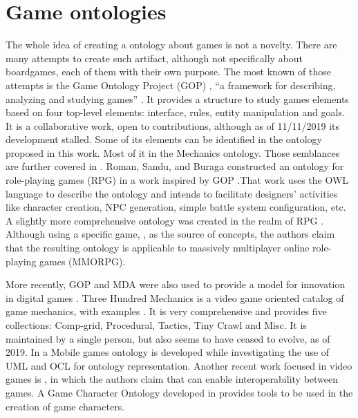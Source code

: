 \section{Game ontologies}

The whole idea of creating a ontology about games is not a novelty. There are many attempts to create such artifact, although not specifically about boardgames, each of them with their own purpose. The most known of those attempts is the Game Ontology Project (GOP) \citep{wiki:gop}, “a framework for describing, analyzing and studying games” \citep{Zagal:2008:GOP}. It  provides  a  structure  to  study  games  elements  based  on four top-level elements:  interface,  rules,  entity manipulation and goals. It  is  a  collaborative  work,  open  to  contributions, although as of 11/11/2019 its development stalled. Some of its elements can be identified in the ontology proposed in this work. Most of it in the Mechanics ontology. Those semblances are further covered in \citep{kritz_buildingOntology}. Roman,  Sandu,  and  Buraga  constructed  an  ontology  for  role-playing games (RPG) in a work inspired by GOP \citep{roman2011owl}.That work uses the OWL language to describe the ontology and intends to facilitate designers’ activities like character creation, NPC generation, simple battle system configuration, etc. A slightly more comprehensive  ontology was created in the realm of RPG \citep{dhuric2015specific}. Although  using  a  specific  game,  \cite{manaworld}, as the source of concepts, the authors claim that the resulting ontology is applicable to massively multiplayer online role-playing games (MMORPG).

More recently, GOP and MDA were also used to provide a model for innovation in digital games \citep{innov:gop:mda}. Three Hundred Mechanics is a video game oriented catalog of game mechanics, with examples \citep{300gm}. It is very comprehensive and provides five collections: Comp-grid, Procedural, Tactics, Tiny Crawl and Misc. It is maintained by a single person, but also seems to have ceased to evolve, as of 2019. In \cite{leon_z._ontology_2010} a Mobile games ontology is developed while investigating the use of UML and OCL for ontology representation. Another recent work focused in video games is \cite{parkkila_ontology_2017}, in which the authors claim that can enable interoperability between games. A Game Character Ontology developed in \cite{sacco_game_2017} provides tools to be used in the creation of game characters.

